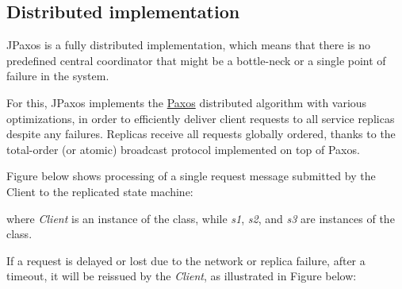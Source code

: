 \subsection{Distributed implementation}
\label{overview:distributed-implementation}
JPaxos is a fully distributed implementation, which means that there
is no predefined central coordinator that might be a bottle-neck or a single
point of failure in the system.

For this, JPaxos implements
the \href{http://en.wikipedia.org/wiki/Paxos\_algorithm}{Paxos}
distributed algorithm with various optimizations, in order to efficiently
deliver client requests to all service replicas despite any failures.
Replicas receive all requests globally ordered, thanks to
the total-order (or atomic) broadcast protocol implemented on top
of Paxos.

Figure below shows processing of a single request message submitted
by the Client to the replicated state machine:
\begin{quote}
\begin{figure}[htbp]
\centering

\end{figure}
\end{quote}

where \emph{Client} is an instance of the  class, while \emph{s1}, \emph{s2},
and \emph{s3} are instances of the  class.

If a request is delayed or lost due to the network or replica failure,
after a timeout, it will be reissued by the \emph{Client}, as illustrated in
Figure below:
\begin{quote}
\begin{figure}[htbp]
\centering

\end{figure}
\end{quote}


